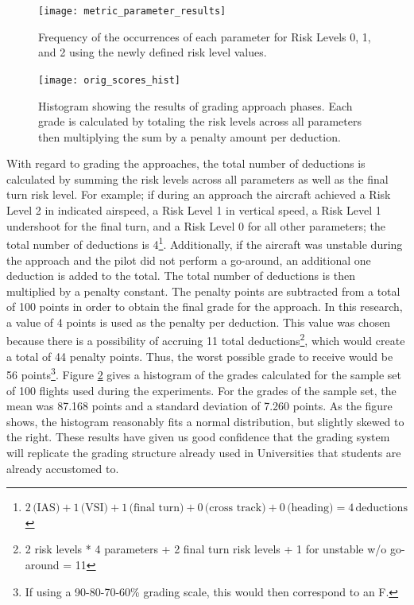 	\begin{figure}
		\centering
		\texttt{[image: metric\_parameter\_results]}
		\caption{Frequency of the occurrences of each parameter for Risk Levels 0, 1, and 2 using the newly defined risk level values.}
		\label{fig:metric_parameter_results}
	\end{figure}
	
	\begin{figure}
		\centering
		\texttt{[image: orig\_scores\_hist]}
		\caption{Histogram showing the results of grading approach phases.  Each grade is calculated by totaling the risk levels across all parameters then multiplying the sum by a penalty amount per deduction.}
		\label{fig:scores_hist}
	\end{figure}
	
	With regard to grading the approaches, the total number of deductions is calculated by summing the risk levels across all parameters as well as the final turn risk level.  For example; if during an approach the aircraft achieved a Risk Level 2 in indicated airspeed, a Risk Level 1 in vertical speed, a Risk Level 1 undershoot for the final turn, and a Risk Level 0 for all other parameters; the total number of deductions is 4\footnote{$2\,\text{(IAS)} + 1\,\text{(VSI)} + 1\,\text{(final turn)} + 0\,\text{(cross track)} + 0\,\text{(heading)} = 4\,\text{deductions}$}.  Additionally, if the aircraft was unstable during the approach and the pilot did not perform a go-around, an additional one deduction is added to the total.  The total number of deductions is then multiplied by a penalty constant.  The penalty points are subtracted from a total of 100 points in order to obtain the final grade for the approach.  In this research, a value of 4 points is used as the penalty per deduction.  This value was chosen because there is a possibility of accruing 11 total deductions\footnote{2 risk levels * 4 parameters + 2 final turn risk levels + 1 for unstable w/o go-around = 11}, which would create a total of 44 penalty points.  Thus, the worst possible grade to receive would be 56 points\footnote{If using a 90-80-70-60\% grading scale, this would then correspond to an F.}.  Figure \ref{fig:scores_hist} gives a histogram of the grades calculated for the sample set of 100 flights used during the experiments.  For the grades of the sample set, the mean was 87.168 points and a standard deviation of 7.260 points.  As the figure shows, the histogram reasonably fits a normal distribution, but slightly skewed to the right.  These results have given us good confidence that the grading system will replicate the grading structure already used in Universities that students are already accustomed to.
        

